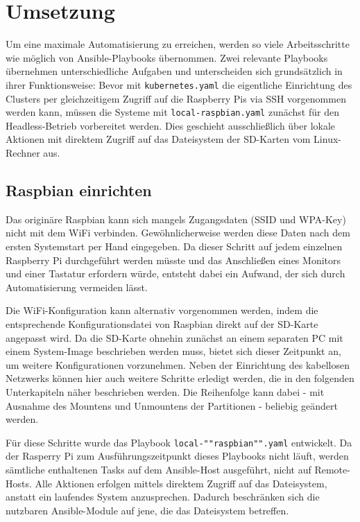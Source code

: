 \chapter{Umsetzung}\label{ch:umsetzung}

Um eine maximale Automatisierung zu erreichen, werden so viele Arbeitsschritte wie möglich von Ansible-Playbooks übernommen.
Zwei relevante Playbooks übernehmen unterschiedliche Aufgaben und unterscheiden sich grundsätzlich in ihrer Funktionsweise:
Bevor mit \texttt{kubernetes.yaml} die eigentliche Einrichtung des Clusters per gleichzeitigem Zugriff auf die Raspberry Pis via SSH vorgenommen werden kann, müssen die Systeme mit \texttt{local-raspbian.yaml} zunächst für den Headless-Betrieb vorbereitet werden.
Dies geschieht ausschließlich über lokale Aktionen mit direktem Zugriff auf das Dateisystem der SD-Karten vom Linux-Rechner aus.

\section{Raspbian einrichten}\label{sec:raspbian-einrichten}

Das originäre Raspbian kann sich mangels Zugangsdaten (SSID und WPA-Key) nicht mit dem WiFi verbinden.
Gewöhnlicherweise werden diese Daten nach dem ersten Systemstart per Hand eingegeben.
Da dieser Schritt auf jedem einzelnen Raspberry Pi durchgeführt werden müsste und das Anschließen eines Monitors und einer Tastatur erfordern würde, entsteht dabei ein Aufwand, der sich durch Automatisierung vermeiden lässt.

Die WiFi-Konfiguration kann alternativ vorgenommen werden, indem die entsprechende Konfigurationsdatei von Raspbian direkt auf der SD-Karte angepasst wird.
Da die SD-Karte ohnehin zunächst an einem separaten PC mit einem System-Image beschrieben werden muss, bietet sich dieser Zeitpunkt an, um weitere Konfigurationen vorzunehmen.
Neben der Einrichtung des kabellosen Netzwerks können hier auch weitere Schritte erledigt werden, die in den folgenden Unterkapiteln näher beschrieben werden.
Die Reihenfolge kann dabei - mit Ausnahme des Mountens und Unmountens der Partitionen - beliebig geändert werden.

Für diese Schritte wurde das Playbook \texttt{local-""raspbian"".yaml} entwickelt.
Da der Rasperry Pi zum Ausführungszeitpunkt dieses Playbooks nicht läuft, werden sämtliche enthaltenen Tasks auf dem Ansible-Host ausgeführt, nicht auf Remote-Hosts.
Alle Aktionen erfolgen mittels direktem Zugriff auf das Dateisystem, anstatt ein laufendes System anzusprechen.
Dadurch beschränken sich die nutzbaren Ansible-Module auf jene, die das Dateisystem betreffen.

